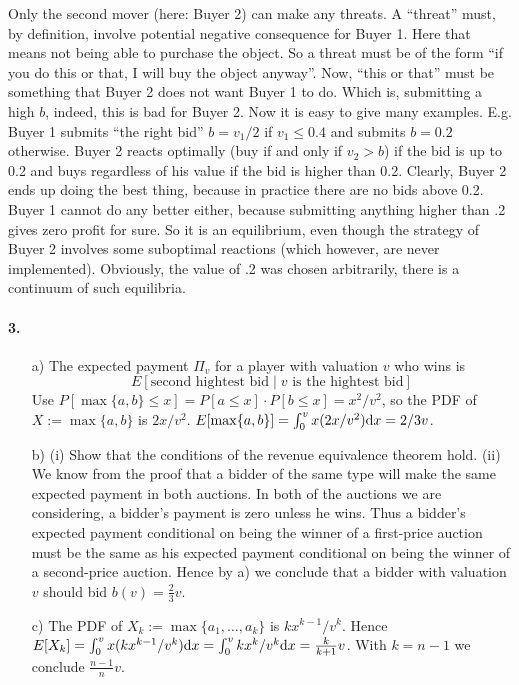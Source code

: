 \documentclass[a4paper,notitlepage,12pt]{article}
\begin{document}
\begin{enumerate}
Only the second mover (here: Buyer 2) can make any threats. A ``threat'' must, by definition, involve potential negative consequence for Buyer 1. Here that means not being able to purchase the object. So a threat
must be of the form ``if you do this or that, I will buy the object anyway''. Now, ``this or that'' must be something that Buyer 2 does not want Buyer 1 to do. Which is, submitting a high $b$, indeed, this is bad for Buyer 2. Now it is easy to give many examples. E.g. Buyer 1 submits ``the right bid'' $b = v_1/2$
if $v_1 \leq 0.4$ and submits $b = 0.2$ otherwise. Buyer 2 reacts optimally (buy if and only if $v_2 > b$) if the bid is up to 0.2 and buys regardless of his value if the bid is higher than 0.2. Clearly, Buyer 2 ends up doing the best thing, because in practice there are no bids above 0.2. Buyer 1 cannot do any better either, because submitting anything higher than .2 gives zero profit for sure. So it is an equilibrium, even though the strategy of Buyer 2 involves some suboptimal reactions (which however, are never implemented). Obviously, the value of .2 was chosen arbitrarily, there is a continuum of such equilibria.


\end{enumerate}

\paragraph{3.}
\begin{enumerate}
\item[a)] The expected payment $\Pi_v$ for a player with valuation $v$ who wins is
\[
 E[\text{second hightest bid} \mid v \text{ is the hightest bid}]
\]
Use $P[\max\{a,b\} \leq x] = P[a \leq x]\cdot P[b \leq x] = x^2/v^2$, so the PDF of $X := \max\{a,b\}$ is $2x/v^2$. $ E[\max\{a,b\}] = \int_0^v x (2x/v^2) { \rm d}x = 2/3v $.
\item[b)] (i) Show that the conditions of the revenue equivalence theorem hold. (ii) We know from the proof that a bidder of the same type will make the same expected payment in both auctions. In both of the auctions we are considering, a bidder's payment is zero unless he wins. Thus a bidder's expected payment conditional on being the winner of a first-price auction must be the same as his expected payment conditional on being the winner of a second-price auction. Hence by a) we conclude that a bidder with valuation $v$ should bid $b(v) = \frac{2}{3}v$.
\item[c)]  The PDF of $X_k := \max\{a_1,\dots,a_k\}$ is $k x^{k-1}/v^k$. Hence \\$E[X_k] = \int_0^v x (k x^{k-1}/v^k) { \rm d}x = \int_0^v  k x^{k}/v^k { \rm d}x = \frac{k}{k+1} v $. With $k=n-1$ we conclude $\frac{n-1}{n} v$.
\end{enumerate}
\end{document}
